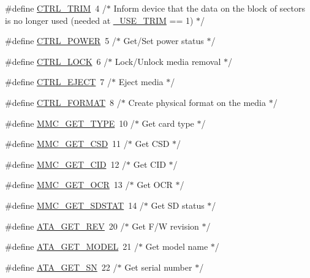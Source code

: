 \begin{DoxyCompactItemize}
\item 
\#define \hyperlink{diskio_8h_af09fd84bea8d4e889e272471f44d60d6}{C\+T\+R\+L\+\_\+\+T\+R\+I\+M}~4	/$\ast$ Inform device that the data on the block of sectors is no longer used (needed at \hyperlink{ffconf_8h_a1f93ee7e57bb9d1221f34bfe80e18a61}{\+\_\+\+U\+S\+E\+\_\+\+T\+R\+I\+M} == 1) $\ast$/
\item 
\#define \hyperlink{diskio_8h_a345531a07462afbd999f414708e3b65b}{C\+T\+R\+L\+\_\+\+P\+O\+W\+E\+R}~5	/$\ast$ Get/Set power status $\ast$/
\item 
\#define \hyperlink{diskio_8h_af40e5cf3000553a978ff6e30dae70858}{C\+T\+R\+L\+\_\+\+L\+O\+C\+K}~6	/$\ast$ Lock/Unlock media removal $\ast$/
\item 
\#define \hyperlink{diskio_8h_a5e40e16d2d7ce196858950f070b9ec03}{C\+T\+R\+L\+\_\+\+E\+J\+E\+C\+T}~7	/$\ast$ Eject media $\ast$/
\item 
\#define \hyperlink{diskio_8h_add07021167069f5914211a2f8830fabb}{C\+T\+R\+L\+\_\+\+F\+O\+R\+M\+A\+T}~8	/$\ast$ Create physical format on the media $\ast$/
\item 
\#define \hyperlink{diskio_8h_aba3a81a9a47c7d1bf3ac7749bc72dcfd}{M\+M\+C\+\_\+\+G\+E\+T\+\_\+\+T\+Y\+P\+E}~10	/$\ast$ Get card type $\ast$/
\item 
\#define \hyperlink{diskio_8h_ae3b858b81287929f7c7bea3b7aec3087}{M\+M\+C\+\_\+\+G\+E\+T\+\_\+\+C\+S\+D}~11	/$\ast$ Get C\+S\+D $\ast$/
\item 
\#define \hyperlink{diskio_8h_a17ad303dd18b19a4c90ab30a8a1c14c4}{M\+M\+C\+\_\+\+G\+E\+T\+\_\+\+C\+I\+D}~12	/$\ast$ Get C\+I\+D $\ast$/
\item 
\#define \hyperlink{diskio_8h_aff118ba6bd7a9fe7699cee049cff5d6c}{M\+M\+C\+\_\+\+G\+E\+T\+\_\+\+O\+C\+R}~13	/$\ast$ Get O\+C\+R $\ast$/
\item 
\#define \hyperlink{diskio_8h_a5cc43c8449b872e16ea5ab42592f793e}{M\+M\+C\+\_\+\+G\+E\+T\+\_\+\+S\+D\+S\+T\+A\+T}~14	/$\ast$ Get S\+D status $\ast$/
\item 
\#define \hyperlink{diskio_8h_a23f5fff3341e98825ea1f7367fd09f1a}{A\+T\+A\+\_\+\+G\+E\+T\+\_\+\+R\+E\+V}~20	/$\ast$ Get F/W revision $\ast$/
\item 
\#define \hyperlink{diskio_8h_a31f556ab98ab80c39058b38d9283865d}{A\+T\+A\+\_\+\+G\+E\+T\+\_\+\+M\+O\+D\+E\+L}~21	/$\ast$ Get model name $\ast$/
\item 
\#define \hyperlink{diskio_8h_a469c4f989757ee1ee404134fea3c74ba}{A\+T\+A\+\_\+\+G\+E\+T\+\_\+\+S\+N}~22	/$\ast$ Get serial number $\ast$/
\end{DoxyCompactItemize}
